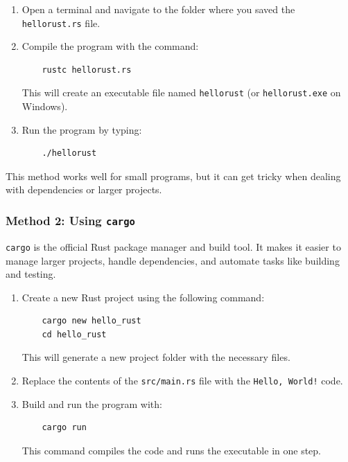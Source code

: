 \documentclass[a4paper,12pt]{report}
\begin{document}
	\begin{enumerate}
		\item Open a terminal and navigate to the folder where you saved the \texttt{hellorust.rs} file.
		\item Compile the program with the command:
		\begin{lstlisting}
	rustc hellorust.rs
		\end{lstlisting}
		This will create an executable file named \texttt{hellorust} (or \texttt{hellorust.exe} on Windows).
		\item Run the program by typing:
		\begin{lstlisting}
	./hellorust
		\end{lstlisting}
	\end{enumerate}
	
		\noindent This method works well for small programs, but it can get tricky when dealing with dependencies or larger projects.
	
	\subsubsection*{Method 2: Using \texttt{cargo}}
	\texttt{cargo} is the official Rust package manager and build tool. It makes it easier to manage larger projects, handle dependencies, and automate tasks like building and testing.
	
	\begin{enumerate}
		\item Create a new Rust project using the following command:
		\begin{lstlisting}
	cargo new hello_rust
	cd hello_rust
		\end{lstlisting}
		\noindent	This will generate a new project folder with the necessary files.
		\item Replace the contents of the \texttt{src/main.rs} file with the \texttt{Hello, World!} code.
		\item Build and run the program with:
		\begin{lstlisting}
	cargo run
		\end{lstlisting}
		\noindent 	This command compiles the code and runs the executable in one step.
	\end{enumerate}
	
\end{document}

